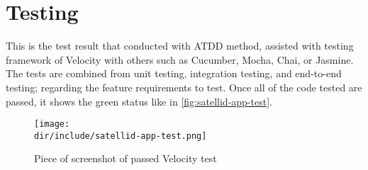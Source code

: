 \clearpage
\section{Testing}
\label{sec:testing}

This is the test result that conducted with \ac{ATDD} method, assisted with testing framework of Velocity with others such as Cucumber, Mocha, Chai, or Jasmine.
The tests are combined from unit testing, integration testing, and end-to-end testing; regarding the feature requirements to test.
Once all of the code tested are passed, it shows the green status like in \autoref{fig:satellid-app-test}.

\begin{figure}[htb]
  \centering
  \texttt{[image: \\dir/include/satellid-app-test.png]}
  \caption{Piece of screenshot of passed Velocity test}
  \label{fig:satellid-app-test}
\end{figure}
